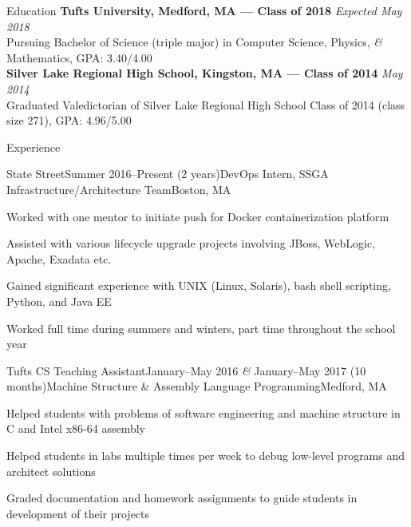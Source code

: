 \documentclass{resume}
\begin{document}
  \begin{rSection}{Education}
    {\bf Tufts University, Medford, MA --- Class of 2018} \hfill {\em Expected May 2018} \\ 
    { Pursuing Bachelor of Science (triple major) in Computer Science, Physics, \textit{\&} Mathematics, GPA: 3.40/4.00 }\\
    {\bf Silver Lake Regional High School, Kingston, MA --- Class of 2014} \hfill {\em May 2014}\\ 
    { Graduated Valedictorian of Silver Lake Regional High School Class of 2014 (class size 271), GPA: 4.96/5.00 }
  \end{rSection}

  \begin{rSection}{Experience}
    \begin{rSubsection}{State Street}{Summer 2016--Present (2 years)}{DevOps Intern, SSGA Infrastructure/Architecture Team}{Boston, MA}
    \item Worked with one mentor to initiate push for Docker containerization platform
    \item Assisted with various lifecycle upgrade projects involving JBoss, WebLogic, Apache, Exadata etc.
    \item Gained significant experience with UNIX (Linux, Solaris), bash shell scripting, Python, and Java EE
    \item Worked full time during summers and winters, part time throughout the school year
    \end{rSubsection}

    \begin{rSubsection}{Tufts CS Teaching Assistant}{January--May 2016 \textit{\&} January--May 2017 (10 months)}{Machine Structure \& Assembly Language Programming}{Medford, MA}
    \item Helped students with problems of software engineering and machine structure in C and Intel x86-64 assembly
    \item Helped students in labs multiple times per week to debug low-level programs and architect solutions
    \item Graded documentation and homework assignments to guide students in development of their projects
    \end{rSubsection}
  \end{rSection}
\end{document}
